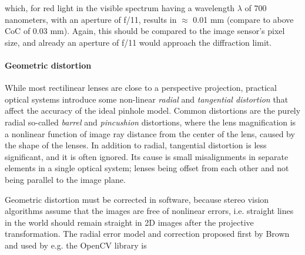 which, for red light in the visible spectrum having a wavelength $\lambda$ of 700 nanometers, with an aperture of f/11, results in $\approx$ 0.01 mm (compare to above CoC of 0.03 mm).
Again, this should be compared to the image sensor's pixel size, and already an aperture of f/11 would approach the diffraction limit.



\paragraph{Geometric distortion}
While most rectilinear lenses are close to a perspective projection, practical optical systems introduce some non-linear \emph{radial} and \emph{tangential distortion} that affect the accuracy of the ideal pinhole model.
Common distortions are the purely radial so-called \emph{barrel} and \emph{pincushion} distortions, where the lens magnification is a nonlinear function of image ray distance from the center of the lens, caused by the shape of the lenses. \cite{brown1966decentering}
In addition to radial, tangential distortion is less significant, and it is often ignored.
Its cause is small misalignments in separate elements in a single optical system; lenses being offset from each other and not being parallel to the image plane. \cite{kingslake1989history}



Geometric distortion must be corrected in software, because stereo vision algorithms assume that the images are free of nonlinear errors, i.e. straight lines in the world should remain straight in 2D images after the projective transformation.
\cite{szeliski10vision}
The radial error model and correction proposed first by Brown \cite{brown1966decentering} and used by e.g. the OpenCV library \cite{opencv} is %

